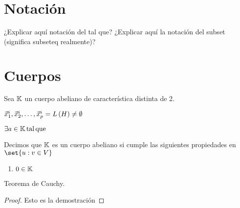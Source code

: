 \documentclass[../ecuaciones_diferenciales.tex]{subfiles}
\begin{document}
\section{Notación}

¿Explicar aquí notación del tal que? ¿Explicar aquí la notación del subset (significa subseteq realmente)?

\section{Cuerpos}

Sea $\K$ un cuerpo abeliano de característica distinta de 2.

$\dlstp{\vx}{p}{i} = \lspan{H} \neq \emptyset$


$\exists a \in \K \st$

\begin{definition}
    Decimos que $\K$ es un cuerpo abeliano si cumple las siguientes propiedades en $\set{u : v \in V}$

    \begin{enumerate}
        \item $0 \in \K$ 
    \end{enumerate}

    \begin{theorem}
        Teorema de Cauchy.        
    \end{theorem}
    \begin{proof}
        Esto es la demostración
    \end{proof}

\end{definition}
\end{document}
